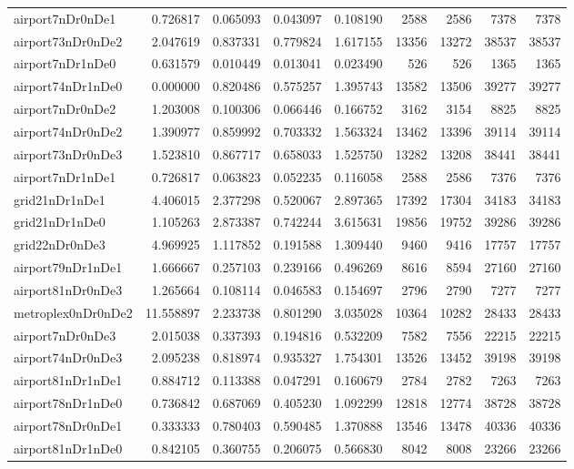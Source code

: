 \begin{longtable}{|l|r|r|r|r|r|r|r|r|}
airport7nDr0nDe1 & 0.726817 & 0.065093 & 0.043097 & 0.108190 & 2588 & 2586 & 7378 & 7378 \\
airport73nDr0nDe2 & 2.047619 & 0.837331 & 0.779824 & 1.617155 & 13356 & 13272 & 38537 & 38537 \\
airport7nDr1nDe0 & 0.631579 & 0.010449 & 0.013041 & 0.023490 & 526 & 526 & 1365 & 1365 \\
airport74nDr1nDe0 & 0.000000 & 0.820486 & 0.575257 & 1.395743 & 13582 & 13506 & 39277 & 39277 \\
airport7nDr0nDe2 & 1.203008 & 0.100306 & 0.066446 & 0.166752 & 3162 & 3154 & 8825 & 8825 \\
airport74nDr0nDe2 & 1.390977 & 0.859992 & 0.703332 & 1.563324 & 13462 & 13396 & 39114 & 39114 \\
airport73nDr0nDe3 & 1.523810 & 0.867717 & 0.658033 & 1.525750 & 13282 & 13208 & 38441 & 38441 \\
airport7nDr1nDe1 & 0.726817 & 0.063823 & 0.052235 & 0.116058 & 2588 & 2586 & 7376 & 7376 \\
grid21nDr1nDe1 & 4.406015 & 2.377298 & 0.520067 & 2.897365 & 17392 & 17304 & 34183 & 34183 \\
grid21nDr1nDe0 & 1.105263 & 2.873387 & 0.742244 & 3.615631 & 19856 & 19752 & 39286 & 39286 \\
grid22nDr0nDe3 & 4.969925 & 1.117852 & 0.191588 & 1.309440 & 9460 & 9416 & 17757 & 17757 \\
airport79nDr1nDe1 & 1.666667 & 0.257103 & 0.239166 & 0.496269 & 8616 & 8594 & 27160 & 27160 \\
airport81nDr0nDe3 & 1.265664 & 0.108114 & 0.046583 & 0.154697 & 2796 & 2790 & 7277 & 7277 \\
metroplex0nDr0nDe2 & 11.558897 & 2.233738 & 0.801290 & 3.035028 & 10364 & 10282 & 28433 & 28433 \\
airport7nDr0nDe3 & 2.015038 & 0.337393 & 0.194816 & 0.532209 & 7582 & 7556 & 22215 & 22215 \\
airport74nDr0nDe3 & 2.095238 & 0.818974 & 0.935327 & 1.754301 & 13526 & 13452 & 39198 & 39198 \\
airport81nDr1nDe1 & 0.884712 & 0.113388 & 0.047291 & 0.160679 & 2784 & 2782 & 7263 & 7263 \\
airport78nDr1nDe0 & 0.736842 & 0.687069 & 0.405230 & 1.092299 & 12818 & 12774 & 38728 & 38728 \\
airport78nDr0nDe1 & 0.333333 & 0.780403 & 0.590485 & 1.370888 & 13546 & 13478 & 40336 & 40336 \\
airport81nDr1nDe0 & 0.842105 & 0.360755 & 0.206075 & 0.566830 & 8042 & 8008 & 23266 & 23266 \\

\end{longtable}
